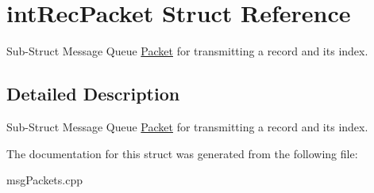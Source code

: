 \hypertarget{structintRecPacket}{\section{int\-Rec\-Packet Struct Reference}
\label{structintRecPacket}
}


Sub-\/\-Struct Message Queue \hyperlink{structPacket}{Packet} for transmitting a record and its index.  




\subsection{Detailed Description}
Sub-\/\-Struct Message Queue \hyperlink{structPacket}{Packet} for transmitting a record and its index. 

The documentation for this struct was generated from the following file\-:\begin{DoxyCompactItemize}
\item 
msg\-Packets.\-cpp\end{DoxyCompactItemize}
